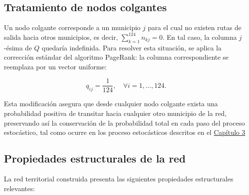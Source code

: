\documentclass[
  spanish,
  us-letterpaper,
]{scrreprt}
\numberwithin{equation}{section}
\begin{document}
\subsection{Tratamiento de nodos
colgantes}\label{tratamiento-de-nodos-colgantes}

Un nodo colgante corresponde a un municipio \(j\) para el cual no
existen rutas de salida hacia otros municipios, es decir,
\(\sum_{k=1}^{124} n_{kj} = 0\). En tal caso, la columna \(j\)-ésima de
\(Q\) quedaría indefinida. Para resolver esta situación, se aplica la
corrección estándar del algoritmo PageRank: la columna correspondiente
se reemplaza por un vector uniforme:

\[
q_{ij} = \frac{1}{124}, \quad \forall i = 1,\dots,124.
\]

Esta modificación asegura que desde cualquier nodo colgante exista una
probabilidad positiva de transitar hacia cualquier otro municipio de la
red, preservando así la conservación de la probabilidad total en cada
paso del proceso estocástico, tal como ocurre en los proceso
estocásticos descritos en el \hyperref[sec-estocasticossegundo]{Capítulo
3}

\subsection{Propiedades estructurales de la
red}\label{propiedades-estructurales-de-la-red}

La red territorial construida presenta las siguientes propiedades
estructurales relevantes:
\end{document}
